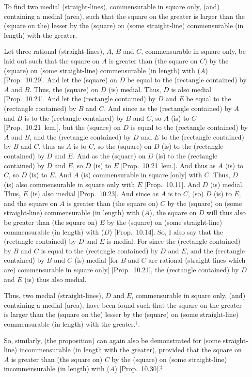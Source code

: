 \begin{Parallel}{}{}
{To find two medial (straight-lines), commensurable in square only, (and) containing a medial (area), such that
the square on the greater is larger than the (square on the) lesser by the
(square) on (some straight-line) commensurable (in length) with the greater.

\epsfysize=0.75in
\centerline{}

Let three rational (straight-lines), $A$, $B$ and $C$, commensurable
in square only, be laid out such that the square on $A$ is greater
than (the square on $C$) by the (square) on (some straight-line)
commensurable (in length) with ($A$) [Prop.~10.29].
And let the (square) on $D$ be equal to the (rectangle contained) by $A$ and
$B$. Thus, the (square) on $D$ (is) medial. Thus, $D$ is also
medial [Prop.~10.21].  And let the 
(rectangle contained) by $D$ and $E$ be equal to the (rectangle contained)
by $B$ and $C$. And since as the (rectangle contained) by $A$ and $B$
is to the (rectangle contained) by $B$ and $C$, so $A$ (is) to $C$
[Prop.~10.21~lem.], but the (square) on $D$
is equal to the (rectangle contained) by $A$ and $B$, and the
(rectangle contained) by $D$ and $E$ to the (rectangle contained) by
$B$ and $C$, thus as $A$ is to $C$, so the (square) on $D$ (is) to
the (rectangle contained) by $D$ and $E$. And as the (square) on $D$
(is) to the (rectangle contained) by $D$ and $E$, so $D$ (is) to $E$ [Prop.~10.21~lem.]. And thus as
$A$ (is) to $C$, so $D$ (is) to $E$. And $A$ (is) commensurable in square
[only] with $C$. Thus, $D$ (is) also commensurable in square only
with $E$ [Prop.~10.11]. And $D$ (is) medial.
Thus, $E$ (is) also medial [Prop.~10.23]. And
since as $A$ is to $C$, (so) $D$ (is) to $E$, and the square on $A$
is greater than (the square on) $C$ by the (square)
on (some straight-line) commensurable (in length) with ($A$),  the square on $D$
will thus also be greater than (the square on) $E$ by the (square) on (some straight-line)
commensurable (in length) with ($D$) [Prop.~10.14].
So, I also say that the (rectangle contained) by $D$ and $E$ is medial.
For since the (rectangle contained) by $B$ and $C$ is equal to the
(rectangle contained) by $D$ and $E$, and the (rectangle contained)
by $B$ and $C$ (is) medial [for $B$ and $C$ are rational
(straight-lines which are) commensurable in square only] [Prop.~10.21], the (rectangle contained) by $D$ and
$E$ (is) thus also medial.

Thus, two medial (straight-lines), $D$ and $E$, commensurable in square only, (and) containing a medial (area), have been found such that
the square on the greater is larger than the (square on the) lesser by the
(square) on (some straight-line) commensurable (in length) with the greater.$^\dag$.

So, similarly, (the proposition) can again also be demonstrated for
(some straight-line) incommensurable (in length with the greater), provided that
the square on $A$ is greater than (the square on) $C$ by the (square)
on (some straight-line) incommensurable (in length) with ($A$) [Prop.~10.30].$^\ddag$}
\end{Parallel}
